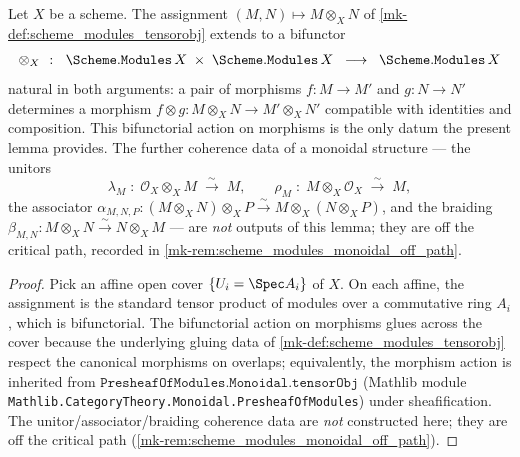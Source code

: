 \begin{lemma}\label{mk-lem:scheme_modules_tensorobj_functoriality}
  \leanok

  Let \(X\) be a scheme. The assignment
  \((M, N) \mapsto M \otimes_X N\) of
  \ref{mk-def:scheme_modules_tensorobj} extends to a bifunctor
  \[
    \otimes_X \;\;\colon\;\; \Scheme.\mathtt{Modules}\,X \;\times\;
                          \Scheme.\mathtt{Modules}\,X \;\;\longrightarrow\;\;
                          \Scheme.\mathtt{Modules}\,X
  \]
  natural in both arguments: a pair of morphisms
  \(f : M \to M'\) and \(g : N \to N'\) determines a morphism
  \(f \otimes g : M \otimes_X N \to M' \otimes_X N'\) compatible with
  identities and composition. This bifunctorial action on morphisms is
  the only datum the present lemma provides. The further coherence data
  of a monoidal structure --- the unitors
  \[
    \lambda_M \;\colon\; \mathcal{O}_X \otimes_X M \;\xrightarrow{\sim}\; M,
    \qquad
    \rho_M \;\colon\; M \otimes_X \mathcal{O}_X \;\xrightarrow{\sim}\; M,
  \]
  the associator
  \(\alpha_{M, N, P} : (M \otimes_X N) \otimes_X P \xrightarrow{\sim}
   M \otimes_X (N \otimes_X P)\), and the braiding
  \(\beta_{M, N} : M \otimes_X N \xrightarrow{\sim} N \otimes_X M\) ---
  are \emph{not} outputs of this lemma; they are off the critical path,
  recorded in \ref{mk-rem:scheme_modules_monoidal_off_path}.
\end{lemma}

\begin{proof}
  \leanok
  Pick an affine open cover \(\{U_i = \Spec A_i\}\) of \(X\). On each
  affine, the assignment is the standard tensor product of modules over a
  commutative ring \(A_i\), which is bifunctorial. The bifunctorial action
  on morphisms glues across the cover because the underlying gluing data of
  \ref{mk-def:scheme_modules_tensorobj} respect the canonical morphisms on
  overlaps; equivalently, the morphism action is inherited from
  \(\mathtt{PresheafOfModules.Monoidal.tensorObj}\) (Mathlib module
  \texttt{Mathlib.CategoryTheory.Monoidal.PresheafOfModules}) under
  sheafification. The unitor/associator/braiding coherence data are
  \emph{not} constructed here; they are off the critical path
  (\ref{mk-rem:scheme_modules_monoidal_off_path}).
\end{proof}

